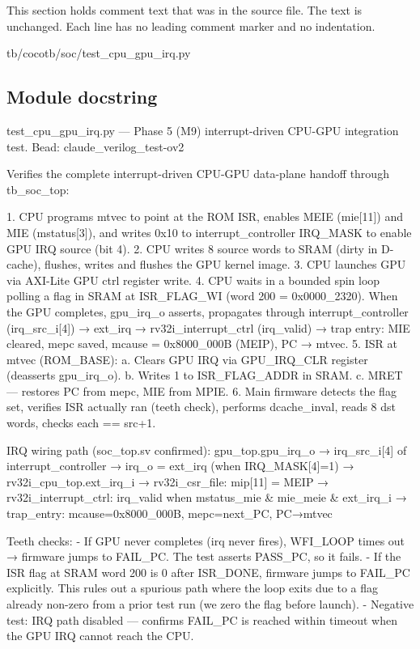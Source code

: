 This section holds comment text that was in the source file. The text is unchanged. Each line has no leading comment marker and no indentation.

\begin{relocated}{tb/cocotb/soc/test_cpu_gpu_irq.py}

\subsection*{Module docstring}

\begin{textblock}
test_cpu_gpu_irq.py — Phase 5 (M9) interrupt-driven CPU-GPU integration test.
Bead: claude_verilog_test-ov2

Verifies the complete interrupt-driven CPU-GPU data-plane handoff through
tb_soc_top:

1. CPU programs mtvec to point at the ROM ISR, enables MEIE (mie[11])
and MIE (mstatus[3]), and writes 0x10 to interrupt_controller IRQ_MASK
to enable GPU IRQ source (bit 4).
2. CPU writes 8 source words to SRAM (dirty in D-cache), flushes, writes
and flushes the GPU kernel image.
3. CPU launches GPU via AXI-Lite GPU ctrl register write.
4. CPU waits in a bounded spin loop polling a flag in SRAM at ISR_FLAG_WI
(word 200 = 0x0000_2320).  When the GPU completes, gpu_irq_o asserts,
propagates through interrupt_controller (irq_src_i[4]) → ext_irq →
rv32i_interrupt_ctrl (irq_valid) → trap entry: MIE cleared, mepc saved,
mcause = 0x8000_000B (MEIP), PC → mtvec.
5. ISR at mtvec (ROM_BASE):
a. Clears GPU IRQ via GPU_IRQ_CLR register (deasserts gpu_irq_o).
b. Writes 1 to ISR_FLAG_ADDR in SRAM.
c. MRET — restores PC from mepc, MIE from MPIE.
6. Main firmware detects the flag set, verifies ISR actually ran (teeth
check), performs dcache_inval, reads 8 dst words, checks each == src+1.

IRQ wiring path (soc_top.sv confirmed):
gpu_top.gpu_irq_o
→ irq_src_i[4] of interrupt_controller
→ irq_o = ext_irq (when IRQ_MASK[4]=1)
→ rv32i_cpu_top.ext_irq_i
→ rv32i_csr_file: mip[11] = MEIP
→ rv32i_interrupt_ctrl: irq_valid when mstatus_mie & mie_meie & ext_irq_i
→ trap_entry: mcause=0x8000_000B, mepc=next_PC, PC→mtvec

Teeth checks:
- If GPU never completes (irq never fires), WFI_LOOP times out →
firmware jumps to FAIL_PC.  The test asserts PASS_PC, so it fails.
- If the ISR flag at SRAM word 200 is 0 after ISR_DONE, firmware
jumps to FAIL_PC explicitly.  This rules out a spurious path where
the loop exits due to a flag already non-zero from a prior test run
(we zero the flag before launch).
- Negative test: IRQ path disabled — confirms FAIL_PC is reached within
timeout when the GPU IRQ cannot reach the CPU.


\end{textblock}
\end{relocated}
